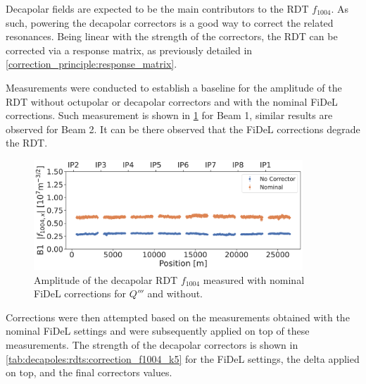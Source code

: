 Decapolar fields are expected to be the main contributors to the RDT $f_{1004}$. As such, powering
the decapolar correctors is a good way to correct the related resonances.
Being linear with the strength of the correctors, the RDT can be corrected via a response matrix,
as previously detailed in \cref{correction_principle:response_matrix}.

Measurements were conducted to establish a baseline for the amplitude of the RDT without octupolar
or decapolar correctors and with the nominal FiDeL corrections. Such measurement is shown in
\cref{fig:decapoles:rdt:b1_fidel_vs_bare} for Beam 1, similar results are observed for Beam 2. It
can be there observed that the FiDeL corrections degrade the RDT.

\begin{figure}[!htb]
    \centering
    \includegraphics[width=0.9\textwidth]{./images/f1004/f1004x_corrections_B1_fidel_vs_bare.pdf}
    \caption{Amplitude of the decapolar RDT $f_{1004}$ measured with nominal FiDeL corrections for 
    $Q'''$ and without.}
    \label{fig:decapoles:rdt:b1_fidel_vs_bare}
\end{figure}


Corrections were then attempted based on the measurements obtained with the nominal FiDeL settings
and were subsequently applied on top of these measurements.
The strength of the decapolar correctors is shown in \cref{tab:decapoles:rdts:correction_f1004_k5}
for the FiDeL settings, the delta applied on top, and the final correctors values.


